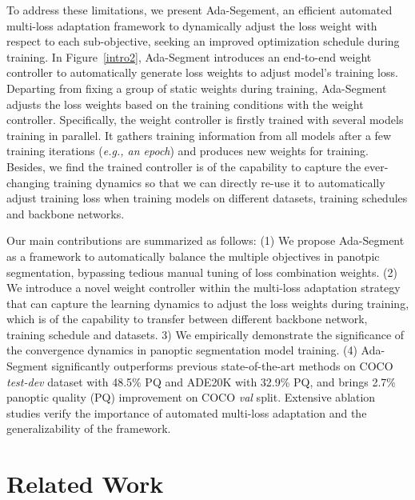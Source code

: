 \documentclass[letterpaper]{article} \usepackage{aaai21}  \usepackage{times}  \usepackage{helvet} \usepackage{courier}  \usepackage[hyphens]{url}  \usepackage{graphicx} \urlstyle{rm} \def\UrlFont{\rm}  \usepackage{natbib}  \usepackage{caption} \frenchspacing  \setlength{\pdfpagewidth}{8.5in}  \setlength{\pdfpageheight}{11in}
\begin{document}
 To address these limitations, 
 we present Ada-Segement, an efficient automated multi-loss adaptation framework 
 to dynamically adjust the loss weight with respect to each sub-objective, 
 seeking an improved optimization schedule during training.
 In Figure~\ref{intro2}, Ada-Segment introduces an end-to-end weight controller 
 to automatically generate loss weights to adjust model's training loss.
Departing from fixing a group of static weights during training, 
 Ada-Segment adjusts the loss weights based on the training conditions 
 with the weight controller.
 Specifically, 
the weight controller is firstly trained with several models training in parallel.
 It gathers training information from all models 
 after a few training iterations (\textit{e.g., an epoch})
 and produces new weights for training. 
 Besides, we find the trained controller is of the capability
 to capture the ever-changing 
 training dynamics so that we can directly re-use it to automatically adjust training loss when training models
 on different datasets, training schedules and backbone networks. 

Our main contributions are summarized as follows:
 (1) We propose Ada-Segment as a framework to automatically balance the multiple objectives 
 in panotpic segmentation, bypassing tedious manual tuning of loss combination weights.
 (2) We introduce a novel weight controller within the multi-loss adaptation strategy 
 that can capture the learning dynamics to adjust the loss weights during training, 
 which is of the capability to transfer between different backbone network, training schedule and 
 datasets. 
3) We empirically demonstrate the significance of the convergence dynamics in 
 panoptic segmentation model training. 
 (4) Ada-Segment significantly outperforms previous state-of-the-art
 methods on COCO \textit{test-dev} dataset with 48.5\% PQ 
 and ADE20K with 32.9\% PQ, 
 and brings 2.7\% panoptic quality (PQ) improvement on COCO \textit{val} split.
 Extensive ablation studies verify the importance 
 of automated multi-loss adaptation and the generalizability of the framework.
 
\section{Related Work}
\end{document}
